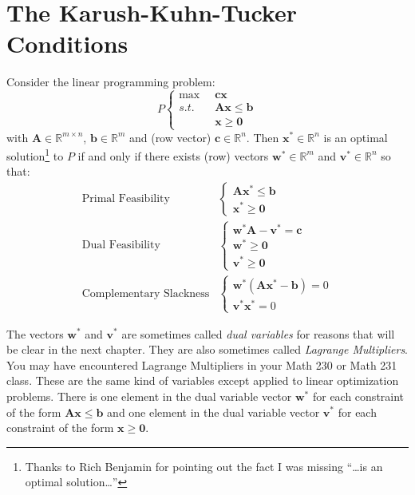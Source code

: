 \section{The Karush-Kuhn-Tucker Conditions}
\begin{theorem} Consider the linear programming problem:
\begin{equation}
P\left\{
\begin{aligned}
\max\;\; & \mathbf{c}\mathbf{x}\\
s.t.\;\; & \mathbf{A}\mathbf{x} \leq \mathbf{b}\\
& \mathbf{x} \geq \mathbf{0}
\end{aligned}\right.
\end{equation}
with $\mathbf{A} \in \mathbb{R}^{m \times n}$, $\mathbf{b} \in \mathbb{R}^m$ and (row vector) $\mathbf{c} \in \mathbb{R}^n$. Then $\mathbf{x}^* \in \mathbb{R}^n$ is an optimal solution\footnote{Thanks to Rich Benjamin for pointing out the fact I was missing ``\dots is an optimal solution\dots''} to $P$ if and only if there exists (row) vectors $\mathbf{w}^* \in \mathbb{R}^m$ and $\mathbf{v}^* \in \mathbb{R}^n$ so that:
\begin{align}
\text{Primal Feasibility}&\left\{ 
\begin{aligned}
\mathbf{A}\mathbf{x}^* \leq \mathbf{b}\\
\mathbf{x}^* \geq \mathbf{0}
\end{aligned}\right.\\
\text{Dual Feasibility}&\left\{ 
\begin{aligned}
\mathbf{w}^*\mathbf{A} - \mathbf{v}^* = \mathbf{c}\\
\mathbf{w}^* \geq \mathbf{0}\\
\mathbf{v}^* \geq \mathbf{0}
\end{aligned}\right.\\
\text{Complementary Slackness}&\left\{ 
\begin{aligned}
\mathbf{w}^*\left(\mathbf{A}\mathbf{x}^* - \mathbf{b}\right) = 0\\
\mathbf{v}^*\mathbf{x}^* = 0
\end{aligned}\right.
\end{align}
\label{thm:KKT}
\end{theorem}
\begin{remark} The vectors $\mathbf{w}^*$ and $\mathbf{v}^*$ are sometimes called \textit{dual variables} for reasons that will be clear in the next chapter. They are also sometimes called \textit{Lagrange Multipliers}. You may have encountered Lagrange Multipliers in your Math 230 or Math 231 class. These are the same kind of variables except applied to linear optimization problems. 
There is one element in the dual variable vector $\mathbf{w}^*$ for each constraint of the form $\mathbf{A}\mathbf{x} \leq \mathbf{b}$ and one element in the dual variable vector $\mathbf{v}^*$ for each constraint of the form $\mathbf{x} \geq \mathbf{0}$. 
\end{remark}
